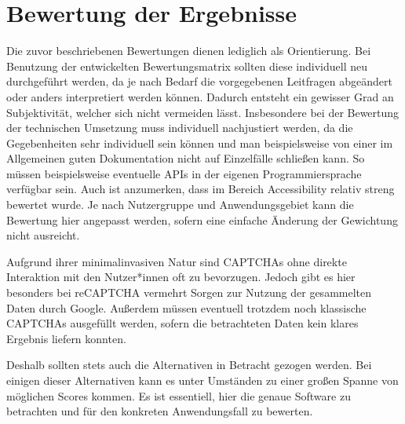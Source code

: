 \chapter{Bewertung der Ergebnisse}
\label{ch:bewertungergebnisse}

Die zuvor beschriebenen Bewertungen dienen lediglich als Orientierung.
Bei Benutzung der entwickelten Bewertungsmatrix sollten diese individuell neu durchgeführt werden,
da je nach Bedarf die vorgegebenen Leitfragen abgeändert oder anders interpretiert werden können.
Dadurch entsteht ein gewisser Grad an Subjektivität, welcher sich nicht vermeiden lässt.
Insbesondere bei der Bewertung der technischen Umsetzung muss individuell nachjustiert werden,
da die Gegebenheiten sehr individuell sein können und man beispielsweise von einer im Allgemeinen 
guten Dokumentation nicht auf Einzelfälle schließen kann.
So müssen beispielsweise eventuelle APIs in der eigenen Programmiersprache verfügbar sein.
Auch ist anzumerken, dass im Bereich Accessibility relativ streng bewertet wurde. 
Je nach Nutzergruppe und Anwendungsgebiet kann die Bewertung hier angepasst werden, sofern eine einfache Änderung der Gewichtung nicht ausreicht.

Aufgrund ihrer minimalinvasiven Natur sind CAPTCHAs ohne direkte Interaktion mit den Nutzer*innen oft zu bevorzugen.
Jedoch gibt es hier besonders bei reCAPTCHA vermehrt Sorgen zur Nutzung der gesammelten Daten durch Google. 
Außerdem müssen eventuell trotzdem noch klassische CAPTCHAs ausgefüllt werden, sofern die betrachteten Daten kein klares Ergebnis liefern konnten.

Deshalb sollten stets auch die Alternativen in Betracht gezogen werden. 
Bei einigen dieser Alternativen kann es unter Umständen zu einer großen Spanne von möglichen Scores kommen.
Es ist essentiell, hier die genaue Software zu betrachten und für den konkreten Anwendungsfall zu bewerten. 